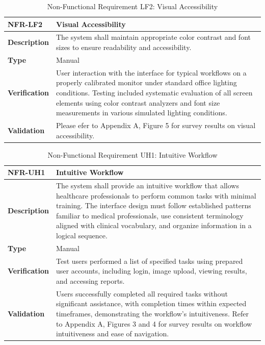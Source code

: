 \documentclass[12pt, titlepage]{article}
\begin{document}
\begin{table}[h!]
\centering
{}
\begin{tabular}{|p{3.5cm}|p{11.5cm}|}
\hline
\rowcolor{gray!30}
\textbf{NFR-LF2} & \textbf{Visual Accessibility} \\
\hline
\textbf{Description} & The system shall maintain appropriate color contrast and font sizes to ensure readability and accessibility.\\
\hline
\textbf{Type} & Manual \\
\hline
\textbf{Verification} & User interaction with the interface for typical workflows on a properly calibrated monitor under standard office lighting conditions. Testing included systematic evaluation of all screen elements using color contrast analyzers and font size measurements in various simulated lighting conditions. \\
\hline
\textbf{Validation} & Please efer to Appendix A, Figure 5 for survey results on visual accessibility. \\
\hline
\end{tabular}
\caption{Non-Functional Requirement LF2: Visual Accessibility}
\end{table}

\begin{table}[h!]
\centering
{}
\begin{tabular}{|p{3.5cm}|p{11.5cm}|}
\hline
\rowcolor{gray!30}
\textbf{NFR-UH1} & \textbf{Intuitive Workflow} \\
\hline
\textbf{Description} & The system shall provide an intuitive workflow that allows healthcare professionals to perform common tasks with minimal training. The interface design must follow established patterns familiar to medical professionals, use consistent terminology aligned with clinical vocabulary, and organize information in a logical sequence. \\
\hline
\textbf{Type} & Manual \\
\hline
\textbf{Verification} & Test users performed a list of specified tasks using prepared user accounts, including login, image upload, viewing results, and accessing reports.\\
\hline
\textbf{Validation} & Users successfully completed all required tasks without significant assistance, with completion times within expected timeframes, demonstrating the workflow's intuitiveness. Refer to Appendix A, Figures 3 and 4 for survey results on workflow intuitiveness and ease of navigation. \\
\hline
\end{tabular}
\caption{Non-Functional Requirement UH1: Intuitive Workflow}
\end{table}
\end{document}
